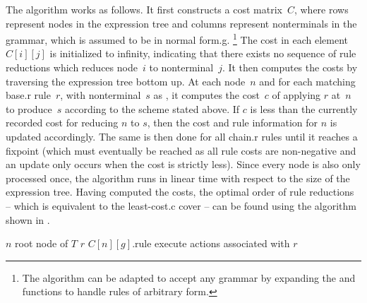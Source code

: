 The algorithm works as follows.
%
It first constructs a cost matrix~$C$, where rows represent \glspl{node} in the
\gls{expression tree} and columns represent \glspl{nonterminal} in the
\gls{grammar}, which is assumed to be in \gls{normal form.g}.\!%
%
\footnote{%
  The algorithm can be adapted to accept any \gls{grammar} by expanding the
   and  functions to
  handle \glspl{rule} of arbitrary form.%
}
%
The cost in each element~\mbox{$C[i][j]$} is initialized to infinity, indicating
that there exists no sequence of \glspl{rule reduction} which reduces
\gls{node}~$i$ to \gls{nonterminal}~$j$.
%
It then computes the costs by traversing the \gls{expression tree} bottom up.
%
At each \gls{node}~$n$ and for each matching \gls{base.r} \gls{rule}~$r$, with
\gls{nonterminal}~$s$ as , it computes the cost~$c$ of
applying $r$ at~$n$ to produce~$s$ according to the scheme stated above.
%
If $c$ is less than the currently recorded cost for reducing $n$ to $s$, then
the cost and \gls{rule} information for $n$ is updated accordingly.
%
The same is then done for all \gls{chain.r} \glspl{rule} until it reaches a
fixpoint (which must eventually be reached as all \gls{rule} costs are
non-negative and an update only occurs when the cost is strictly less).
%
Since every \gls{node} is also only processed once, the algorithm runs in linear
time with respect to the size of the \gls{expression tree}.
%
Having computed the costs, the optimal order of \glspl{rule reduction} -- which
is equivalent to the \gls{least-cost.c} \gls{cover} -- can be found using the
algorithm shown in .

\begin{algorithm}[t]
  {%
    $n$ \Assign root node of $T$\;
    $r$ \Assign $C[n][g]$.rule\;
    execute actions associated with $r$\;
  }

  \caption[%
            Algorithm for selecting the rules chosen by
          ]%
          {%
            Selects optimal sequence of rules that reduces a given expression
            tree to a given nonterminal, based on costs computed
            by %
          }
\end{algorithm}

